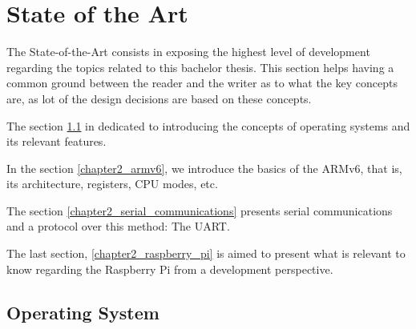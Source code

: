 \chapter{State of the Art}

The State-of-the-Art consists in exposing the highest level of development regarding the topics related to this bachelor thesis. This section helps having a common ground between the reader and the writer as to what the key concepts are, as lot of the design decisions are based on these concepts.

The section \ref{chapter2_operating_system} in dedicated to introducing the concepts of operating systems and its relevant features.

In the section \ref{chapter2_armv6}, we introduce the basics of the ARMv6, that is, its architecture, registers, CPU modes, etc.

The section \ref{chapter2_serial_communications} presents serial communications and a protocol over this method: The UART.

The last section, \ref{chapter2_raspberry_pi} is aimed to present what is relevant to know regarding the Raspberry Pi from a development perspective.

\section{Operating System}\label{chapter2_operating_system}

